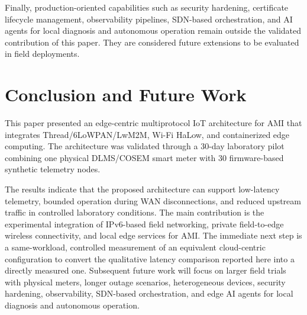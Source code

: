 \documentclass[conference]{IEEEtran}
\begin{document}
Finally, production-oriented capabilities such as security hardening, certificate lifecycle management, observability pipelines, SDN-based orchestration, and AI agents for local diagnosis and autonomous operation remain outside the validated contribution of this paper. They are considered future extensions to be evaluated in field deployments.

\section{Conclusion and Future Work}
\label{sec:conclusion}

This paper presented an edge-centric multiprotocol IoT architecture for AMI that integrates Thread/6LoWPAN/LwM2M, Wi-Fi HaLow, and containerized edge computing. The architecture was validated through a 30-day laboratory pilot combining one physical DLMS/COSEM smart meter with 30 firmware-based synthetic telemetry nodes.

The results indicate that the proposed architecture can support low-latency telemetry, bounded operation during WAN disconnections, and reduced upstream traffic in controlled laboratory conditions. The main contribution is the experimental integration of IPv6-based field networking, private field-to-edge wireless connectivity, and local edge services for AMI. The immediate next step is a same-workload, controlled measurement of an equivalent cloud-centric configuration to convert the qualitative latency comparison reported here into a directly measured one. Subsequent future work will focus on larger field trials with physical meters, longer outage scenarios, heterogeneous devices, security hardening, observability, SDN-based orchestration, and edge AI agents for local diagnosis and autonomous operation.
\end{document}
